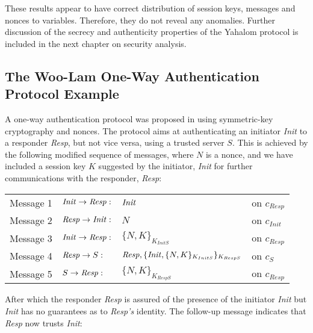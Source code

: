 \documentclass[10pt,a4paper,final,oneside,fleqn]{book}
\begin{document}
These results appear to have correct distribution of session keys, messages and nonces to variables.  Therefore, they do not reveal any anomalies.  Further discussion of the secrecy and authenticity properties of the Yahalom protocol is included in the next chapter on security analysis.
\subsection{The Woo-Lam One-Way Authentication Protocol Example \label{sect:anwoolam}}
A one-way authentication protocol was proposed in \cite{woo1} using symmetric-key cryptography and nonces.  The protocol aims at authenticating an initiator {\itshape Init\/} to a responder {\itshape Resp\/}, but not vice versa, using a trusted server $S$.  This is achieved by the following modified sequence of messages, where $N$ is a nonce, and we have included a session key $K$ suggested by the initiator, {\itshape Init\/} for further communications with the responder, {\itshape Resp\/}:\vspace{5mm}

\begin{tabular}{llll}
Message 1&\hspace{5mm}$\mbox{{\itshape Init\/}}\to\mbox{{\itshape Resp\/}}:$&$\mbox{{\itshape Init\/}}$&on $c_{Resp}$\\
Message 2&\hspace{5mm}$\mbox{{\itshape Resp\/}}\to\mbox{{\itshape Init\/}}:$&$N$&on $c_{Init}$\\
Message 3&\hspace{5mm}$\mbox{{\itshape Init\/}}\to\mbox{{\itshape Resp\/}}:$&$\{N,K\}_{K_{InitS}}$&on $c_{Resp}$\\
Message 4&\hspace{5mm}$\mbox{{\itshape Resp\/}}\to S:$&$\mbox{{\itshape Resp\/}},\{\mbox{{\itshape Init\/}},\{N,K\}_{K_{InitS}}\}_{K_{RespS}}$&on $c_{S}$\\
Message 5&\hspace{5mm}$S\to \mbox{{\itshape Resp\/}}:$&$\{N,K\}_{K_{RespS}}$&on $c_{Resp}$
\end{tabular}\vspace{5mm}

\noindent
After which the responder {\itshape Resp\/} is assured of the presence of the initiator {\itshape Init\/} but {\itshape Init\/} has no guarantees as to {\itshape Resp's\/} identity.  The follow-up message indicates that {\itshape Resp\/} now trusts {\itshape Init\/}:\vspace{5mm}
\end{document}
